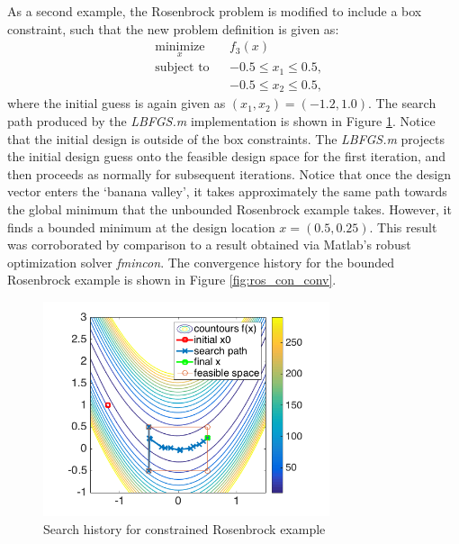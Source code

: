 \documentclass[11pt]{article}
\begin{document}
As a second example, the Rosenbrock problem is modified
to include a box constraint, such that the new problem
definition is given as:
\begin{equation}
\begin{aligned}
& \underset{x}{\text{minimize}}
& & f_3(x) \\
& \text{subject to}
& & -0.5 \leq x_1 \leq 0.5, \\
& & & -0.5 \leq x_2 \leq 0.5,
\end{aligned}
\end{equation}
%
where the initial guess is again given as
$(x_1, x_2) = (-1.2, 1.0)$.
The search path produced by the \emph{LBFGS.m} implementation
is shown in Figure \ref{fig:rosenbrock_constrained}. Notice
that the initial design is outside of the box constraints.
The \emph{LBFGS.m} projects the initial design guess onto
the feasible design space for the first iteration, and then
proceeds as normally for subsequent iterations. Notice
that once the design vector enters the `banana valley',
it takes approximately the same path towards the global
minimum that the unbounded Rosenbrock example takes.
However, it finds a bounded minimum at the design location
$x = (0.5,0.25)$. This result was corroborated by
comparison to a result obtained via Matlab's robust optimization
solver \emph{fmincon}. The convergence history for the
bounded Rosenbrock example is shown in Figure \ref{fig:ros_con_conv}.
%
\begin{figure}[hbt]
\centering
\includegraphics[width=0.75\textwidth]{rosenbrock_bounded}
\caption{Search history for constrained Rosenbrock example}
\label{fig:rosenbrock_constrained}
\end{figure}
%
\end{document}

